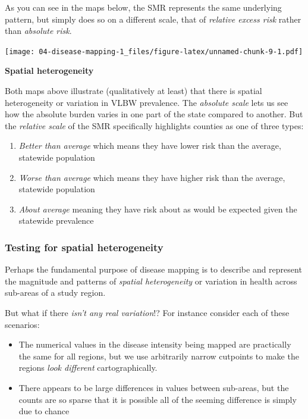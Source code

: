 \documentclass[
]{book}
\providecommand{\tightlist}{%
  \setlength{\itemsep}{0pt}\setlength{\parskip}{0pt}}
\newenvironment{rmdtip}[1]
  {
  \begin{itemize}
  \renewcommand{\labelitemi}{
    \raisebox{-.7\height}[0pt][0pt]{
      {\setkeys{Gin}{width=3em,keepaspectratio}\texttt{[image: images/\#1]}}
    }
  }
  \setlength{\fboxsep}{1em}
  \begin{tip}
  \item
  }
  {
  \end{tip}
  \end{itemize}
  }
\begin{document}
As you can see in the maps below, the SMR represents the same underlying pattern, but simply does so on a different scale, that of \emph{relative excess risk} rather than \emph{absolute risk}.

\texttt{[image: 04-disease-mapping-1\_files/figure-latex/unnamed-chunk-9-1.pdf]}

\begin{rmdtip}{tip}

\textbf{Spatial heterogeneity}

Both maps above illustrate (qualitatively at least) that there is spatial heterogeneity or variation in VLBW prevalence. The \emph{absolute scale} lets us see how the absolute burden varies in one part of the state compared to another. But the \emph{relative scale} of the SMR specifically highlights counties as one of three types:

\begin{enumerate}
\def\labelenumi{\arabic{enumi}.}
\tightlist
\item
  \emph{Better than average} which means they have lower risk than the average, statewide population
\item
  \emph{Worse than average} which means they have higher risk than the average, statewide population
\item
  \emph{About average} meaning they have risk about as would be expected given the statewide prevalence
\end{enumerate}

\end{rmdtip}

\hypertarget{testing-for-spatial-heterogeneity}{%
\subsubsection{Testing for spatial heterogeneity}\label{testing-for-spatial-heterogeneity}}

Perhaps the fundamental purpose of disease mapping is to describe and represent the magnitude and patterns of \emph{spatial heterogeneity} or variation in health across sub-areas of a study region.

But what if there \emph{isn't any real variation}!? For instance consider each of these scenarios:

\begin{itemize}
\tightlist
\item
  The numerical values in the disease intensity being mapped are practically the same for all regions, but we use arbitrarily narrow cutpoints to make the regions \emph{look different} cartographically.
\item
  There appears to be large differences in values between sub-areas, but the counts are so sparse that it is possible all of the seeming difference is simply due to chance
\end{itemize}
\end{document}

